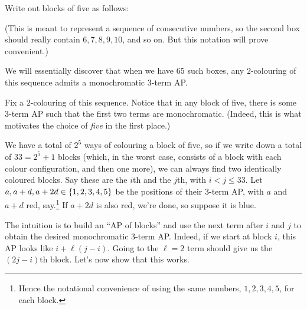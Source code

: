 Write out blocks of five as follows:

\begin{figure}[h] %
    \centering
\end{figure}

(This is meant to represent a sequence of consecutive numbers, so the second box should really contain $6, 7, 8, 9, 10$, and so on. But this notation will prove convenient.)

We will essentially discover that when we have $65$ such boxes, any $2$-colouring of this sequence admits a monochromatic $3$-term AP.

Fix a $2$-colouring of this sequence. Notice that in any block of five, there is some $3$-term AP such that the first two terms are monochromatic. (Indeed, this is what motivates the choice of \textit{five} in the first place.)

We have a total of $2^5$ ways of colouring a block of five, so if we write down a total of $33 = 2^5 + 1$ blocks (which, in the worst case, consists of a block with each colour configuration, and then one more), we can always find two identically coloured blocks. Say these are the $i$th and the $j$th, with $i < j \leq 33$. Let $a, a + d, a + 2d \in \left\{ 1, 2, 3, 4, 5 \right\}$ be the positions of their $3$-term AP, with $a$ and $a + d$ red, say.\footnote{Hence the notational convenience of using the same numbers, $1, 2, 3, 4, 5$, for each block.} If $a + 2d$ is also red, we're done, so suppose it is blue.

The intuition is to build an ``AP of blocks'' and use the next term after $i$ and $j$ to obtain the desired monochromatic $3$-term AP. Indeed, if we start at block $i$, this AP looks like $i + \ell (j - i)$. Going to the $\ell = 2$ term should give us the $(2j - i)$th block. Let's now show that this works.


